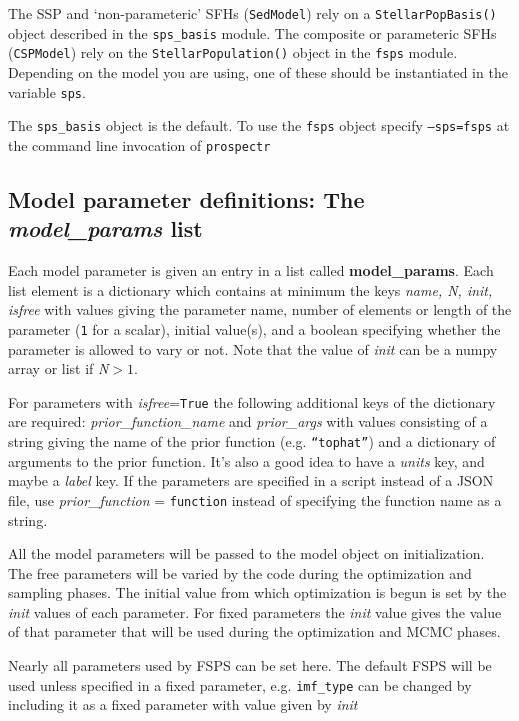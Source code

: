 The SSP and `non-parameteric' SFHs (\texttt{SedModel}) rely on a
\texttt{StellarPopBasis()} object described in the \texttt{sps_basis}
module.  The composite or parameteric SFHs (\texttt{CSPModel}) rely on
the \texttt{StellarPopulation()} object in the \texttt{fsps} module.
Depending on the model you are using, one of these should be
instantiated in the variable \texttt{sps}.

The \texttt{sps_basis} object is the default.  To use the
\texttt{fsps} object specify \texttt{--sps=fsps} at the command line
invocation of \texttt{prospectr}

\subsection{Model parameter definitions: The \emph{model_params} list}
Each model parameter is given an entry in a list called {\bf
model_params}. Each list element is a dictionary which contains at
minimum the keys {\it name, N, init, isfree} with values giving the
parameter name, number of elements or length of the parameter
(\texttt{1} for a scalar), initial value(s), and a boolean specifying
whether the parameter is allowed to vary or not.  Note that the value
of {\it init} can be a numpy array or list if {\it N}$>1$.

For parameters with {\it isfree}=\texttt{True} the following
additional keys of the dictionary are required: {\it
prior_function_name} and {\it prior_args} with values consisting of a
string giving the name of the prior function
(e.g. \texttt{``tophat''}) and a dictionary of arguments to the prior
function. It's also a good idea to have a {\it units} key, and maybe a
{\it label} key.  If the parameters are specified in a script instead
of a JSON file, use {\it prior_function} = \texttt{function} instead
of specifying the function name as a string.

All the model parameters will be passed to the model object on
initialization.  The free parameters will be varied by the code during
the optimization and sampling phases.  The initial value from which
optimization is begun is set by the {\it init} values of each
parameter.  For fixed parameters the {\it init} value gives the value
of that parameter that will be used during the optimization and MCMC
phases.

Nearly all parameters used by FSPS can be set here.  The default FSPS
will be used unless specified in a fixed parameter,
e.g. \texttt{imf_type} can be changed by including it as a fixed
parameter with value given by {\it init}

